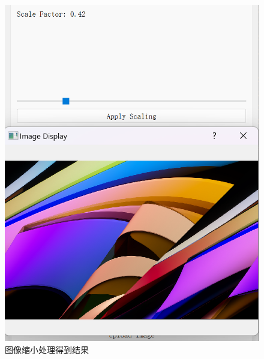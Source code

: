 \documentclass[a4paper,12pt]{article}
\begin{document}
\begin{figure}
    \centering
    \begin{minipage}[b]{0.48\textwidth}
        \centering
        \includegraphics[width=\linewidth]{images/Design/image_processing/4/transformation1.png}
        \caption{图像缩小处理得到结果}
    \end{minipage}
    \hfill
    \begin{minipage}[b]{0.48\textwidth}
        \centering

\end{minipage}
\end{figure}
\end{document}
